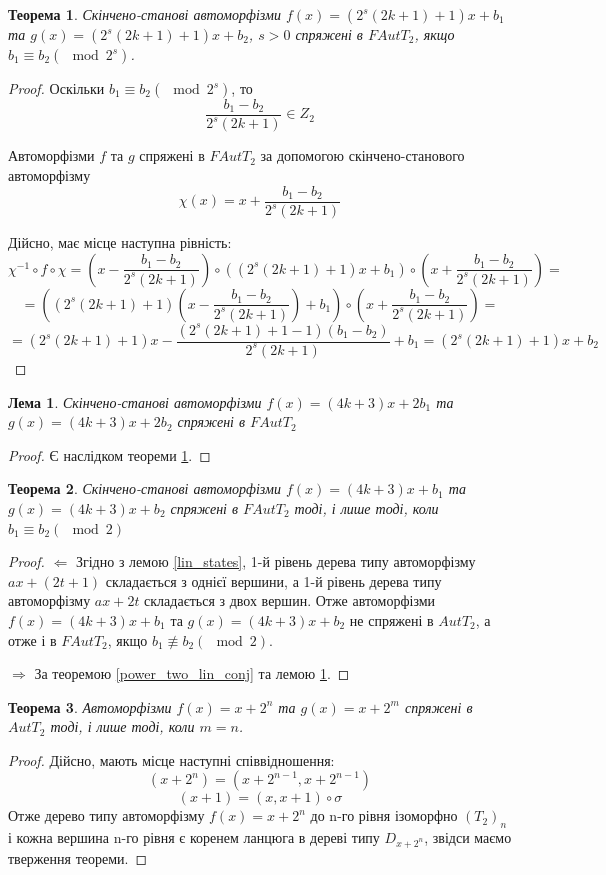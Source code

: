 \documentclass[a4paper,12pt]{article} \usepackage{a4wide}
\numberwithin{equation}{subsection}
\newtheorem{theorem}{Теорема}[subsection]
\newtheorem{lemma}{Лема}[subsection]
\begin{document}
\begin{theorem}\label{4kp1ConjFinal}
  Скінчено-станові автоморфізми $f(x)=(2^s(2k+1)+1)x + b_1$ та
  $g(x)=(2^s(2k+1)+1)x + b_2$, $s > 0$ спряжені в $FAutT_2$, якщо $
  b_1 \equiv b_2 (\mod 2^s) $.
\end{theorem}
\begin{proof}
  Оскільки $ b_1 \equiv b_2 (\mod 2^s) $, то
 $$\frac{b_1-b_2}{2^s(2k+1)}\in Z_2$$

 Автоморфізми $f$ та $g$ спряжені в $FAutT_2$ за допомогою
 скінчено-станового автоморфізму
 $$\chi(x) = x + \frac{b_1-b_2}{2^s(2k+1)}$$ 

 Дійсно, має місце наступна рівність:
$$\chi ^{-1}\circ f \circ \chi  = (x - \frac{b_1-b_2}{2^s(2k+1)}) \circ ((2^s(2k+1)+1)x + b_1) \circ (x + \frac{b_1-b_2}{2^s(2k+1)}) =  $$
$$= ((2^s(2k+1)+1)(x - \frac{b_1-b_2}{2^s(2k+1)}) + b_1) \circ (x + \frac{b_1-b_2}{2^s(2k+1)}) = $$
$$ = (2^s(2k+1)+1)x - \frac{(2^s(2k+1)+1 - 1)(b_1-b_2)}{2^s(2k+1)} + b_1 =  (2^s(2k+1)+1)x + b_2 $$

\end{proof}

\begin{lemma}\label{4kp3PowerTwoConj}
  Скінчено-станові автоморфізми $f(x)=(4k+3)x + 2b_1$ та $g(x)=(4k+3)x
  + 2b_2$ спряжені в $FAutT_2$
\end{lemma}
\begin{proof}
  Є наслідком теореми \ref{4kp1ConjFinal}.
\end{proof}

\begin{theorem}\label{4kp3ConjFinal}
  Скінчено-станові автоморфізми $f(x)=(4k+3)x + b_1$ та $g(x)=(4k+3)x
  + b_2$ спряжені в $FAutT_2$ тоді, і лише тоді, коли $ b_1 \equiv b_2
  (\mod 2)$
\end{theorem}
\begin{proof}
  $\Leftarrow$ Згідно з лемою \ref{lin_states}, 1-й рівень дерева типу
  автоморфізму $ax+(2t+1)$ складається з однієї вершини, а 1-й рівень
  дерева типу автоморфізму $ax+2t$ складається з двох вершин. Отже
  автоморфізми $f(x)=(4k+3)x + b_1$ та $g(x)=(4k+3)x + b_2$ не
  спряжені в $AutT_2$, а отже і в $FAutT_2$, якщо $ b_1 \not\equiv b_2
  (\mod 2)$.


  $\Rightarrow$ За теоремою \ref{power_two_lin_conj} та лемою
  \ref{4kp3PowerTwoConj}.
\end{proof}



\begin{theorem}
  Автоморфізми $f(x)= x + 2^n$ та $g(x)= x + 2^m$ спряжені в $AutT_2$
  тоді, і лише тоді, коли $m=n$.
\end{theorem}
\begin{proof}
  Дійсно, мають місце наступні співвідношення:
$$(x+2^n) = (x+2^{n-1}, x+2^{n-1})$$
$$(x+1) = (x , x+1)\circ \sigma$$
Отже дерево типу автоморфізму $f(x)= x + 2^n$ до n-го рівня ізоморфно
$(T_2)_n$ і кожна вершина n-го рівня є коренем ланцюга в дереві типу
$D_{x+2^n}$, звідси маємо тверження теореми.
\end{proof}
\end{document}
